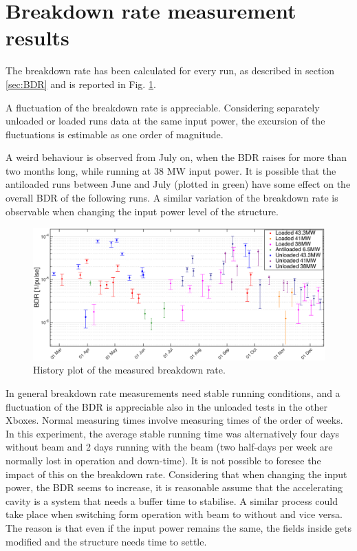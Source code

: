 \section[Breakdown rate measurement results]{Breakdown rate measurement results}

The breakdown rate has been calculated for every run, as described in section \ref{sec:BDR} and is reported in Fig. \ref{BDR_history}. 

A fluctuation of the breakdown rate is appreciable. Considering separately unloaded or loaded runs data at the same input power, the excursion of the fluctuations is estimable as one order of magnitude. 

A weird behaviour is observed from July on, when the BDR raises for more than two months long, while running at 38 MW input power. It is possible that the antiloaded runs between June and July (plotted in green) have some effect on the overall BDR of the following runs. A similar variation of the breakdown rate is observable when changing the input power level of the structure.


\begin{landscape}

\begin{figure}
\centering 
\includegraphics[scale=0.62]{pictures/bdr_hist.png}
\caption{History plot of the measured breakdown rate.}
\label{BDR_history}
\end{figure}
 
\end{landscape}



In general breakdown rate measurements need stable running conditions, and a fluctuation of the BDR is appreciable also in the unloaded tests in the other Xboxes. Normal measuring times involve measuring times of the order of weeks. In this experiment, the average stable running time was alternatively four days without beam and 2 days running with the beam (two half-days per week are normally lost in operation and down-time). It is not possible to foresee the impact of this on the breakdown rate. Considering that when changing the input power, the BDR seems to increase, it is reasonable assume that the accelerating cavity is a system that needs a buffer time to stabilise. A similar process could take place when switching form operation with beam to without and vice versa. The reason is that even if the input power remains the same, the fields inside gets modified and the structure needs time to settle. 


